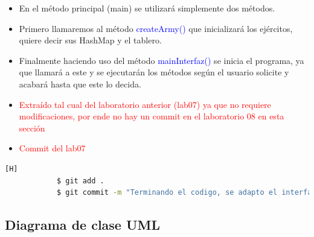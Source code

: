 \documentclass{article}
\begin{document}
        \begin{itemize}
            \item En el método principal (main) se utilizará simplemente dos métodos.
            \item Primero llamaremos al método \textcolor{blue}{createArmy()} que inicializará los ejércitos, quiere decir sus HashMap y el tablero.
            \item Finalmente haciendo uso del método \textcolor{blue}{mainInterfaz()} se inicia el programa, ya que llamará a este y se ejecutarán los métodos según el usuario solicite y acabará hasta que este lo decida.
            \item \textcolor{red}{Extraído tal cual del laboratorio anterior (lab07) ya que no requiere modificaciones, por ende no hay un commit en el laboratorio 08 en esta sección}
        \end{itemize}
        
        
        

        \begin{itemize}
            \item 
            \textcolor{red}{Commit del lab07}
        \end{itemize}
        
        \begin{lstlisting}[language=bash,caption={Commit \href{https://github.com/hernanchoquehuanca/fp2-23b/commit/5410f630dc5c356dbbbf0e370259d000622a6ea7}{5410f63}: Último commit, donde se implementó el método de la interfaz, sobre el cual está puesto los métodos del programa}][H]
    		$ git add .
    		$ git commit -m "Terminando el codigo, se adapto el interfaz al metodo main y se concluyo el metodo del mismo
    	\end{lstlisting}
     
\newpage
        \subsection{Diagrama de clase UML}
\end{document}
